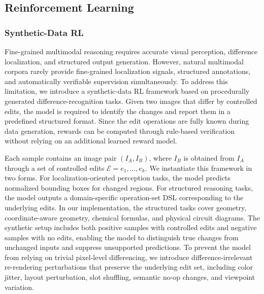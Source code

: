 \documentclass{article} %
\begin{document}
\subsection{Reinforcement Learning}

\subsubsection{Synthetic-Data RL}
\label{sec:synthetic-data-rl}

Fine-grained multimodal reasoning requires accurate visual perception, difference localization, and structured output generation. However, natural multimodal corpora rarely provide fine-grained localization signals, structured annotations, and automatically verifiable supervision simultaneously. To address this limitation, we introduce a synthetic-data RL framework based on procedurally generated difference-recognition tasks. Given two images that differ by controlled edits, the model is required to identify the changes and report them in a predefined structured format. Since the edit operations are fully known during data generation, rewards can be computed through rule-based verification without relying on an additional learned reward model.


Each sample contains an image pair $(I_A, I_B)$, where $I_B$ is obtained from $I_A$ through a set of controlled edits $\mathcal{E}={e_1,\ldots,e_k}$. We instantiate this framework in two forms. For localization-oriented perception tasks, the model predicts normalized bounding boxes for changed regions. For structured reasoning tasks, the model outputs a domain-specific operation-set DSL corresponding to the underlying edits. In our implementation, the structured tasks cover geometry, coordinate-aware geometry, chemical formulas, and physical circuit diagrams. The synthetic setup includes both positive samples with controlled edits and negative samples with no edits, enabling the model to distinguish true changes from unchanged inputs and suppress unsupported predictions. To prevent the model from relying on trivial pixel-level differencing, we introduce difference-irrelevant re-rendering perturbations that preserve the underlying edit set, including color jitter, layout perturbation, slot shuffling, semantic no-op changes, and viewpoint variation.
\end{document}
